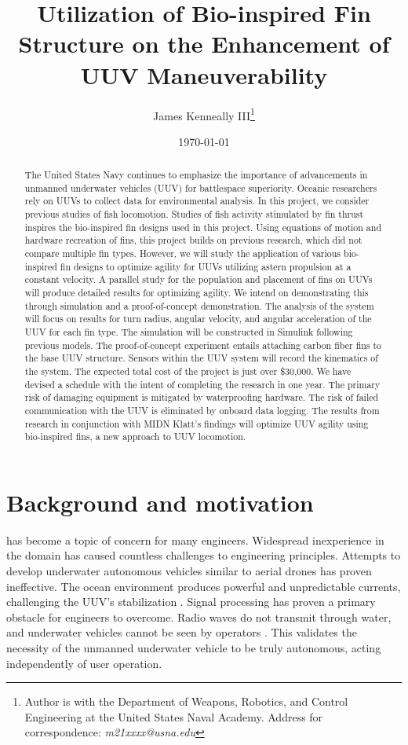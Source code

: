 \documentclass{IEEEtran}
\title{Utilization of Bio-inspired Fin Structure on the Enhancement of UUV Maneuverability}
\author{James Kenneally III\thanks{Author is with the Department of Weapons, Robotics, and Control Engineering at the United States Naval Academy. Address for correspondence: \emph{m21xxxx@usna.edu}}}
\date{\today}
\begin{document}
\maketitle
\begin{abstract}
The United States Navy continues to emphasize the importance of advancements in unmanned underwater vehicles (UUV) for battlespace superiority.  Oceanic researchers rely on UUVs to collect data for environmental analysis.  In this project, we consider previous studies of fish locomotion.  Studies of fish activity stimulated by fin thrust inspires the bio-inspired fin designs used in this project.  Using equations of motion and hardware recreation of fins, this project builds on previous research, which did not compare multiple fin types.  However, we will study the application of various bio-inspired fin designs to optimize agility for UUVs utilizing astern propulsion at a constant velocity.  A parallel study for the population and placement of fins on UUVs will produce detailed results for optimizing agility.  We intend on demonstrating this through simulation and a proof-of-concept demonstration.  The analysis of the system will focus on results for turn radius, angular velocity, and angular acceleration of the UUV for each fin type.  The simulation will be constructed in Simulink following previous models.  The proof-of-concept experiment entails attaching carbon fiber fins to the base UUV structure.  Sensors within the UUV system will record the kinematics of the system.  The expected total cost of the project is just over \$30,000.  We have devised a schedule with the intent of completing the research in one year.  The primary risk of damaging equipment is mitigated by waterproofing hardware.  The risk of failed communication with the UUV is eliminated by onboard data logging.  The results from research in conjunction with MIDN Klatt’s findings will optimize UUV agility using bio-inspired fins, a new approach to UUV locomotion.  
\end{abstract}

\section{Background and motivation}
 has become a topic of concern for many engineers.  Widespread inexperience in the domain has caused countless challenges to engineering principles.  Attempts to develop underwater autonomous vehicles similar to aerial drones has proven ineffective.  The ocean environment produces powerful and unpredictable currents, challenging the UUV’s stabilization \cite{risen2019underwater}.  Signal processing has proven a primary obstacle for engineers to overcome.  Radio waves do not transmit through water, and underwater vehicles cannot be seen by operators \cite{risen2019underwater}.  This validates the necessity of the unmanned underwater vehicle to be truly autonomous, acting independently of user operation.  
\end{document}
